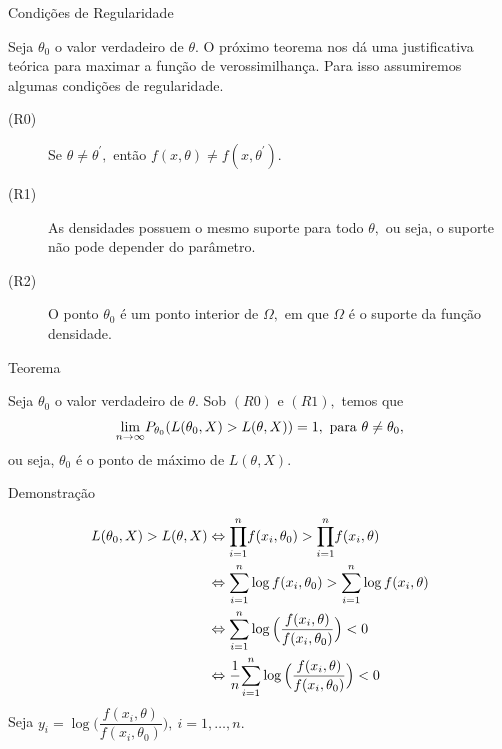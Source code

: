 \documentclass[12pt]{beamer}
\begin{document}
\begin{frame}{Condições de Regularidade}
\begin{block}{}
\justifying
Seja $\theta_{0}$ o valor verdadeiro de $\theta.$ O próximo teorema nos dá uma justificativa teórica para maximar a função de verossimilhança. Para isso assumiremos algumas condições de regularidade. 
\begin{description}
\item[(R0)~] Se $\theta\neq \theta^{'},$ então $f(x,\theta)\neq f(x,\theta^{'}).$
\item[(R1)~] As densidades possuem o mesmo suporte para todo $\theta,$ ou seja, o suporte não pode depender do parâmetro.
\item[(R2)~] O ponto $\theta_{0}$ é um ponto interior de $\Omega,$ em que $\Omega$ é o suporte da função densidade.
\end{description}
\end{block}
\end{frame}

\begin{frame}{Teorema}
\begin{Teorema}\label{Teo1}
\justifying
Seja $\theta_{0}$ o valor verdadeiro de $\theta.$ Sob $(R0)$ e $(R1),$ temos que
\begin{align*}
    {\displaystyle \lim_{n\to\infty}} P_{\theta_{0}}(L(\theta_{0},X)>L(\theta,X))=1,~\text{para}~\theta\neq \theta_{0},
\end{align*}
ou seja, $\theta_{0}$ é o ponto de máximo de $L(\theta,X).$
\end{Teorema}
\end{frame}

\begin{frame}{Demonstração}
\begin{block}{}
\justifying
\begin{align*}
L(\theta_{0},X)>L(\theta,X)&\Leftrightarrow {\displaystyle {\displaystyle \prod_{i=1}^{n}}f(x_{i},\theta_{0})>{\displaystyle \prod_{i=1}^{n}}f(x_{i},\theta)}\\
&\Leftrightarrow{\displaystyle \sum_{i=1}^{n}}\log{f(x_{i},\theta_{0})}>{\displaystyle \sum_{i=1}^{n}}\log{f(x_{i},\theta)}\\
&\Leftrightarrow{\displaystyle \sum_{i=1}^{n}}\log{\Big(\dfrac{f(x_{i},\theta)}{f(x_{i},\theta_{0})}\Big)}<0\\
&\Leftrightarrow\dfrac{1}{n}{\displaystyle \sum_{i=1}^{n}}\log{\Big(\dfrac{f(x_{i},\theta)}{f(x_{i},\theta_{0})}\Big)}<0
\end{align*}
Seja $y_{i}=\log{\Big(\dfrac{f(x_{i},\theta)}{f(x_{i},\theta_{0})}\Big)},~i=1,\ldots,n.$
\end{block}
\end{frame}
\end{document}
